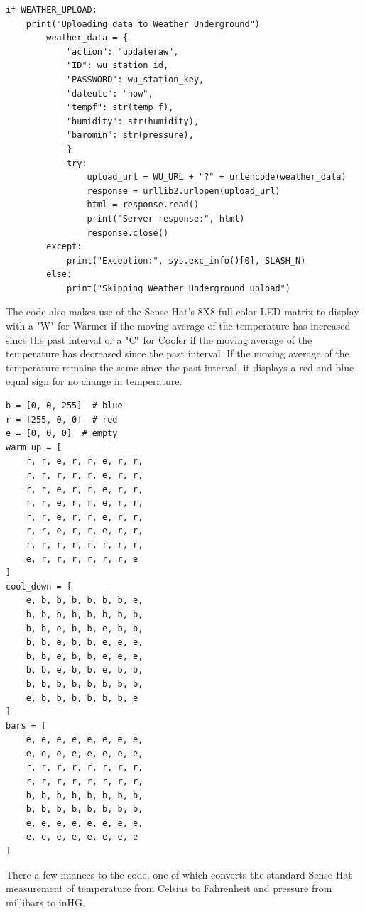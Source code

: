 \documentclass[sigconf]{acmart}
\begin{document}
\begin{code}
\begin{verbatim}
if WEATHER_UPLOAD:
    print("Uploading data to Weather Underground")
        weather_data = {
            "action": "updateraw",
            "ID": wu_station_id,
            "PASSWORD": wu_station_key,
            "dateutc": "now",
            "tempf": str(temp_f),
            "humidity": str(humidity),
            "baromin": str(pressure),
            }
            try:
                upload_url = WU_URL + "?" + urlencode(weather_data)
                response = urllib2.urlopen(upload_url)
                html = response.read()
                print("Server response:", html)
                response.close()  
        except:
            print("Exception:", sys.exc_info()[0], SLASH_N)
        else:
            print("Skipping Weather Underground upload")
\end{verbatim}
\end{code}

The code also makes use of the Sense Hat's 8X8 full-color LED matrix to display with a "W" for Warmer if the moving average of the temperature has increased since the past interval or a "C" for Cooler if the moving average of the temperature has decreased since the past interval. If the moving average of the temperature remains the same since the past interval, it displays a red and blue equal sign for no change in temperature. 

\begin{code}
\begin{verbatim}
b = [0, 0, 255]  # blue
r = [255, 0, 0]  # red
e = [0, 0, 0]  # empty
warm_up = [
    r, r, e, r, r, e, r, r,
    r, r, r, r, r, e, r, r,
    r, r, e, r, r, e, r, r,
    r, r, e, r, r, e, r, r,
    r, r, e, r, r, e, r, r,
    r, r, e, r, r, e, r, r,
    r, r, r, r, r, r, r, r,
    e, r, r, r, r, r, r, e
]
cool_down = [
    e, b, b, b, b, b, b, e,
    b, b, b, b, b, b, b, b,
    b, b, e, b, b, e, b, b,
    b, b, e, b, b, e, e, e,
    b, b, e, b, b, e, e, e,
    b, b, e, b, b, e, b, b,
    b, b, b, b, b, b, b, b,
    e, b, b, b, b, b, b, e
]
bars = [
    e, e, e, e, e, e, e, e,
    e, e, e, e, e, e, e, e,
    r, r, r, r, r, r, r, r,
    r, r, r, r, r, r, r, r,
    b, b, b, b, b, b, b, b,
    b, b, b, b, b, b, b, b,
    e, e, e, e, e, e, e, e,
    e, e, e, e, e, e, e, e
]
\end{verbatim}
\end{code}

There a few nuances to the code, one of which converts the standard Sense Hat measurement of temperature from Celsius to Fahrenheit and pressure from millibars to inHG. 
\end{document}
